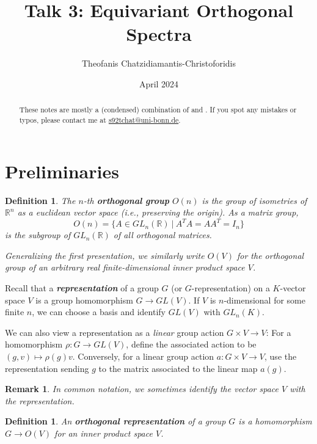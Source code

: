 \documentclass{scrartcl}
\title{Talk 3: Equivariant Orthogonal Spectra}
\author{Theofanis Chatzidiamantis-Christoforidis}
\date{April 2024}
\newcommand{\textbi}[1]{\textbf{\textit{#1}}}
\newcommand{\bR}{\mathbb{R}}
\newtheorem{defin}[subsection]{Definition}
\newtheorem{rem}[subsection]{Remark}
\begin{document}
\renewcommand{\abstractname}{\vspace{-\baselineskip}}

\maketitle
\begin{abstract}
   These notes are mostly a (condensed) combination of \cite[3.1]{GHT} and \cite[1-3]{Sch23}. If you spot any mistakes or typos, please contact me at \href{mailto:s92tchat@uni-bonn.de}{s92tchat@uni-bonn.de}. 
\end{abstract}

\section{Preliminaries}

\begin{defin}
    The $n$-th \textbi{orthogonal group} $O(n)$ is the group of isometries of $\bR^n$ as a euclidean vector space (i.e., preserving the origin). As a matrix group, $$O(n)=\{A\in GL_n(\bR)\ |\ A^TA=AA^T=I_n\}$$ is the subgroup of $GL_n(\bR)$ of all orthogonal matrices. 
    \par Generalizing the first presentation, we similarly write $O(V)$ for the orthogonal group of an arbitrary real finite-dimensional inner product space $V$.
\end{defin}

Recall that a \textbi{representation} of a group $G$ (or $G$-representation) on a $K$-vector space $V$ is a group homomorphism $G\to GL(V)$. If $V$ is $n$-dimensional for some finite $n$, we can choose a basis and identify $GL(V)$ with $GL_n(K)$.
\par We can also view a representation as a \textit{linear} group action $G\times V\to V$: For a homomorphism $\rho:G\to GL(V)$, define the associated action to be $(g, v)\mapsto \rho(g)v$. Conversely, for a linear group action $a:G\times V\to V$, use the representation sending $g$ to the matrix associated to the linear map $a(g)$.

\begin{rem}
    In common notation, we sometimes identify the vector space $V$ with the representation.
\end{rem}

\begin{defin}
    An \textbi{orthogonal representation} of a group $G$ is a homomorphism $G\to O(V)$ for an inner product space $V$. 
\end{defin} 
\end{document}
